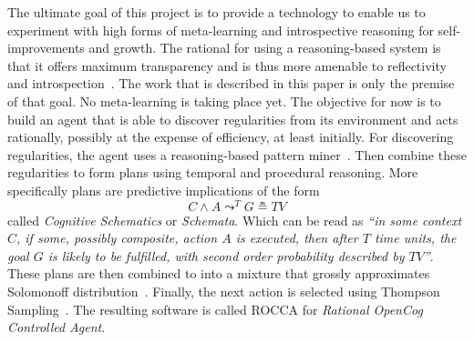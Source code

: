 \documentclass[runningheads]{llncs}
\newcommand{\lpreimp}[1]{\leadsto^{#1}}
\begin{document}
The ultimate goal of this project is to provide a technology to enable
us to experiment with high forms of meta-learning and introspective
reasoning for self-improvements and growth.  The rational for using a
reasoning-based system is that it offers maximum transparency and is
thus more amenable to reflectivity and
introspection~\cite{Schmidhuber2003, Goertzel2014EGI1}.  The work that
is described in this paper is only the premise of that goal.  No
meta-learning is taking place yet.  The objective for now is to build
an agent that is able to discover regularities from its environment
and acts rationally, possibly at the expense of efficiency, at least
initially.  For discovering regularities, the agent uses a
reasoning-based pattern miner~\cite{Geisweiller2019}.  Then combine
these regularities to form plans using temporal and procedural
reasoning.  More specifically plans are predictive implications of the
form
$$C \land A \lpreimp{T} G \measeq \textit{TV}$$
called \emph{Cognitive Schematics} or \emph{Schemata}.  Which can be
read as \emph{``in some context $C$, if some, possibly composite,
  action $A$ is executed, then after $T$ time units, the goal $G$ is
  likely to be fulfilled, with second order probability described by
  $\textit{TV}$''}.  These plans are then combined to into a mixture
that grossly approximates Solomonoff
distribution~\cite{Geisweiller2018}.  Finally, the next action is
selected using Thompson Sampling~\cite{Leike2016}.
The resulting software is called ROCCA for \emph{Rational OpenCog
  Controlled Agent}.


\end{document}
